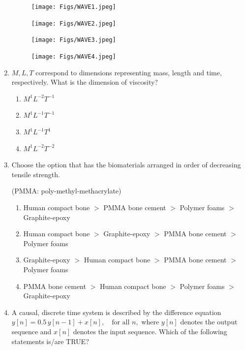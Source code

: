 \documentclass[journal]{IEEEtran}
\begin{document}
\begin{enumerate}
\begin{figure}[H]
\centering
\texttt{[image: Figs/WAVE1.jpeg]}
\caption{}
\end{figure}

\begin{figure}[H]
\centering
\texttt{[image: Figs/WAVE2.jpeg]}
\caption{}
\end{figure}

\begin{figure}[H]
\centering
\texttt{[image: Figs/WAVE3.jpeg]}
\caption{}
\end{figure}

\begin{figure}[H]
\centering
\texttt{[image: Figs/WAVE4.jpeg]}
\caption{}
\end{figure}
\hfill{}

\item  \( M, L, T \) correspond to dimensions representing mass, length and time, respectively. What is the dimension of viscosity?

\begin{enumerate}
    \item \( M^1 L^{-2} T^{-1} \)
    \item \( M^1 L^{-1} T^{-1} \)
    \item \( M^1 L^{-1} T^{1} \)
    \item \( M^1 L^{-2} T^{-2} \)
\end{enumerate}
\hfill{}

\item  Choose the option that has the biomaterials arranged in order of decreasing tensile strength.

(PMMA: poly-methyl-methacrylate)

\begin{enumerate}
    \item Human compact bone $>$ PMMA bone cement $>$ Polymer foams $>$ Graphite-epoxy
    \item Human compact bone $>$ Graphite-epoxy $>$ PMMA bone cement $>$ Polymer foams
    \item Graphite-epoxy $>$ Human compact bone $>$ PMMA bone cement $>$ Polymer foams
    \item PMMA bone cement $>$ Human compact bone $>$ Polymer foams $>$ Graphite-epoxy
\end{enumerate}
\hfill{}

\item  A causal, discrete time system is described by the difference equation
$
y[n] = 0.5 \, y[n - 1] + x[n], \quad \text{for all } n,
$
where \( y[n] \) denotes the output sequence and \( x[n] \) denotes the input sequence.
Which of the following statements is/are TRUE?


\end{enumerate}
\end{document}

